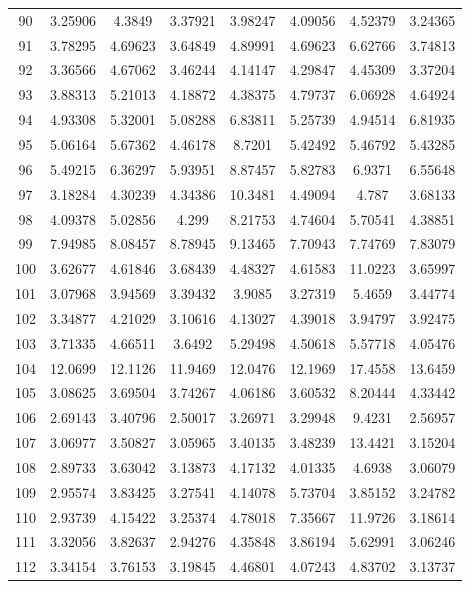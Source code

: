 \begin{figure}
\begin{tabular}{cccccccc}
90 & 3.25906 & 4.3849 & 3.37921 & 3.98247 & 4.09056 & 4.52379 & 3.24365\\
91 & 3.78295 & 4.69623 & 3.64849 & 4.89991 & 4.69623 & 6.62766 & 3.74813\\
92 & 3.36566 & 4.67062 & 3.46244 & 4.14147 & 4.29847 & 4.45309 & 3.37204\\
93 & 3.88313 & 5.21013 & 4.18872 & 4.38375 & 4.79737 & 6.06928 & 4.64924\\
94 & 4.93308 & 5.32001 & 5.08288 & 6.83811 & 5.25739 & 4.94514 & 6.81935\\
95 & 5.06164 & 5.67362 & 4.46178 & 8.7201 & 5.42492 & 5.46792 & 5.43285\\
96 & 5.49215 & 6.36297 & 5.93951 & 8.87457 & 5.82783 & 6.9371 & 6.55648\\
97 & 3.18284 & 4.30239 & 4.34386 & 10.3481 & 4.49094 & 4.787 & 3.68133\\
98 & 4.09378 & 5.02856 & 4.299 & 8.21753 & 4.74604 & 5.70541 & 4.38851\\
99 & 7.94985 & 8.08457 & 8.78945 & 9.13465 & 7.70943 & 7.74769 & 7.83079\\
100 & 3.62677 & 4.61846 & 3.68439 & 4.48327 & 4.61583 & 11.0223 & 3.65997\\
101 & 3.07968 & 3.94569 & 3.39432 & 3.9085 & 3.27319 & 5.4659 & 3.44774\\
102 & 3.34877 & 4.21029 & 3.10616 & 4.13027 & 4.39018 & 3.94797 & 3.92475\\
103 & 3.71335 & 4.66511 & 3.6492 & 5.29498 & 4.50618 & 5.57718 & 4.05476\\
104 & 12.0699 & 12.1126 & 11.9469 & 12.0476 & 12.1969 & 17.4558 & 13.6459\\
105 & 3.08625 & 3.69504 & 3.74267 & 4.06186 & 3.60532 & 8.20444 & 4.33442\\
106 & 2.69143 & 3.40796 & 2.50017 & 3.26971 & 3.29948 & 9.4231 & 2.56957\\
107 & 3.06977 & 3.50827 & 3.05965 & 3.40135 & 3.48239 & 13.4421 & 3.15204\\
108 & 2.89733 & 3.63042 & 3.13873 & 4.17132 & 4.01335 & 4.6938 & 3.06079\\
109 & 2.95574 & 3.83425 & 3.27541 & 4.14078 & 5.73704 & 3.85152 & 3.24782\\
110 & 2.93739 & 4.15422 & 3.25374 & 4.78018 & 7.35667 & 11.9726 & 3.18614\\
111 & 3.32056 & 3.82637 & 2.94276 & 4.35848 & 3.86194 & 5.62991 & 3.06246\\
112 & 3.34154 & 3.76153 & 3.19845 & 4.46801 & 4.07243 & 4.83702 & 3.13737\\

\end{tabular}
\end{figure}
